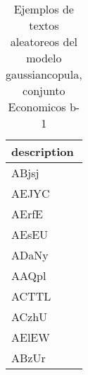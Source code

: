 \begin{table}[H]
\centering
\fontsize{8}{14}\selectfont
\caption{Ejemplos de textos aleatoreos del modelo gaussiancopula, conjunto Economicos b-1}
\label{table-sample10-economicos-b-1-gaussiancopula-text}
\begin{tabular}{|m{50em}|}
\hline
\rowcolor[gray]{0.8}
description \\
\hline ABjsj \\
\hline AEJYC \\
\hline AErfE \\
\hline AEsEU \\
\hline ADaNy \\
\hline AAQpl \\
\hline ACTTL \\
\hline ACzhU \\
\hline AElEW \\
\hline ABzUr \\
\hline
\end{tabular}
\end{table}
